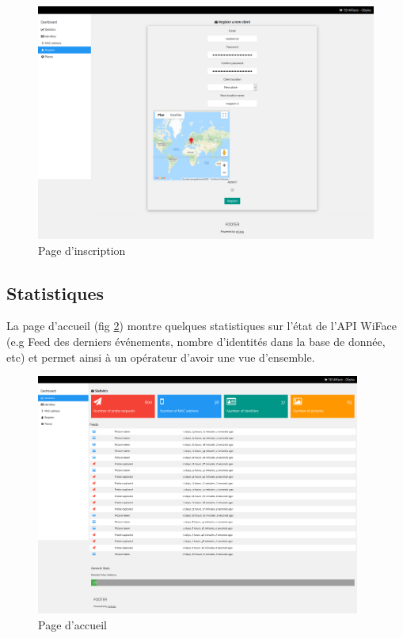 \clearpage
\newpage
\thispagestyle{empty}
\begin{landscape}
    \centering
\thispagestyle{empty}
\begin{figure}[H]
	\includegraphics[width=0.95\linewidth]{images/dashboard/register.png}
	\caption{Page d'inscription}
	\label{fig:dashboard_register}
\end{figure}
\end{landscape}

\subsection{Statistiques}

La page d'accueil (fig \ref{fig:dashboard_stats}) montre quelques statistiques sur l'état de l'API WiFace (e.g Feed des derniers événements, nombre d'identités dans la base de donnée, etc)
et permet ainsi à un opérateur d'avoir une vue d'ensemble.
\clearpage
\newpage
\thispagestyle{empty}
\begin{landscape}
    \centering
\thispagestyle{empty}
\begin{figure}[H]
	\includegraphics[width=0.95\textwidth]{images/dashboard/statistics.png}
	\caption{Page d'accueil}
	\label{fig:dashboard_stats}
\end{figure}
\end{landscape}

